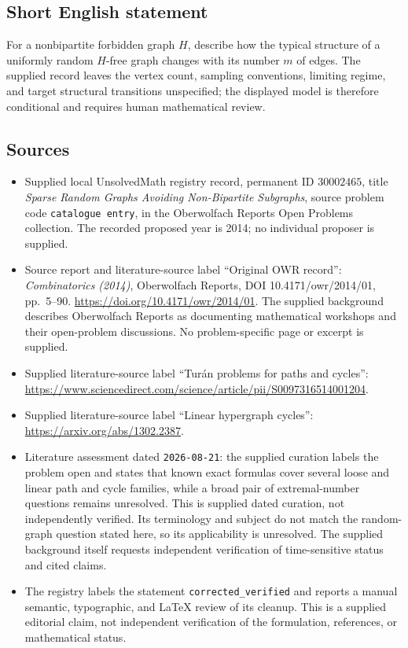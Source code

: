 \documentclass[11pt]{article}
\begin{document}
\subsection{Short English statement}
For a nonbipartite forbidden graph \(H\), describe how the typical structure of a uniformly random \(H\)-free graph changes with its number \(m\) of edges. The supplied record leaves the vertex count, sampling conventions, limiting regime, and target structural transitions unspecified; the displayed model is therefore conditional and requires human mathematical review.
\subsection{Sources}
\begin{itemize}
\item Supplied local UnsolvedMath registry record, permanent ID \(30002465\), title \emph{Sparse Random Graphs Avoiding Non-Bipartite Subgraphs}, source problem code \texttt{catalogue entry}, in the Oberwolfach Reports Open Problems collection. The recorded proposed year is 2014; no individual proposer is supplied.
\item Source report and literature-source label ``Original OWR record'': \emph{Combinatorics (2014)}, Oberwolfach Reports, DOI 10.4171/owr/2014/01, pp.\ 5--90. \url{https://doi.org/10.4171/owr/2014/01}. The supplied background describes Oberwolfach Reports as documenting mathematical workshops and their open-problem discussions. No problem-specific page or excerpt is supplied.
\item Supplied literature-source label ``Tur\'an problems for paths and cycles'': \url{https://www.sciencedirect.com/science/article/pii/S0097316514001204}.
\item Supplied literature-source label ``Linear hypergraph cycles'': \url{https://arxiv.org/abs/1302.2387}.
\item Literature assessment dated \texttt{2026-08-21}: the supplied curation labels the problem open and states that known exact formulas cover several loose and linear path and cycle families, while a broad pair of extremal-number questions remains unresolved. This is supplied dated curation, not independently verified. Its terminology and subject do not match the random-graph question stated here, so its applicability is unresolved. The supplied background itself requests independent verification of time-sensitive status and cited claims.
\item The registry labels the statement \texttt{corrected\_verified} and reports a manual semantic, typographic, and LaTeX review of its cleanup. This is a supplied editorial claim, not independent verification of the formulation, references, or mathematical status.
\end{itemize}
\end{document}
